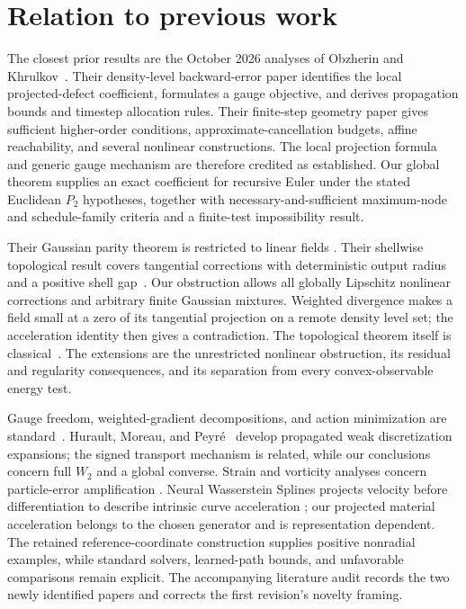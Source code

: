 \documentclass[journal,10pt,romanappendices]{IEEEtran}
\theoremstyle{definition}
\begin{document}
\section{Relation to previous work}
\label{sec:related}

The closest prior results are the October 2026 analyses of Obzherin and
Khrulkov~\citep{obzherin2026density,obzherin2026finite}. Their density-level
backward-error paper identifies the local projected-defect coefficient,
formulates a gauge objective, and derives propagation bounds and timestep
allocation rules. Their finite-step geometry paper gives sufficient
higher-order conditions, approximate-cancellation budgets, affine
reachability, and several nonlinear constructions. The local projection
formula and generic gauge mechanism are therefore credited as established.
Our global theorem supplies an exact coefficient for recursive Euler under
the stated Euclidean $P_2$ hypotheses, together with necessary-and-sufficient
maximum-node and schedule-family criteria and a finite-test impossibility
result.

Their Gaussian parity theorem is restricted to linear fields
\citep[Theorem~12]{obzherin2026density}. Their shellwise topological result
covers tangential corrections with deterministic output radius and a positive
shell gap~\citep[Theorem~34]{obzherin2026finite}. Our obstruction allows all
globally Lipschitz nonlinear corrections and arbitrary finite Gaussian
mixtures. Weighted divergence makes a field small at a zero of its
tangential projection on a remote density level set; the acceleration
identity then gives a contradiction. The topological theorem itself is
classical~\citep{hatcher2002algebraic}. The extensions are the unrestricted
nonlinear obstruction, its residual and regularity consequences, and its
separation from every convex-observable energy test.

Gauge freedom, weighted-gradient decompositions, and action minimization are
standard~\citep{ambrosio2005gradient,horvat2024gauge,neklyudov2023action}.
Hurault, Moreau, and Peyr\'e~\citep{hurault2026geometry} develop propagated
weak discretization expansions; the signed transport mechanism is related,
while our conclusions concern full $W_2$ and a global converse. Strain and
vorticity analyses concern particle-error amplification
\citep{tao2026strain}. Neural Wasserstein Splines projects velocity before
differentiation to describe intrinsic curve acceleration
\citep{banerjee2026splines}; our projected material acceleration belongs to
the chosen generator and is representation dependent. The retained
reference-coordinate construction supplies positive nonradial examples,
while standard solvers, learned-path bounds, and unfavorable comparisons
remain explicit. The accompanying literature audit records the two newly
identified papers and corrects the first revision's novelty framing.
\end{document}
